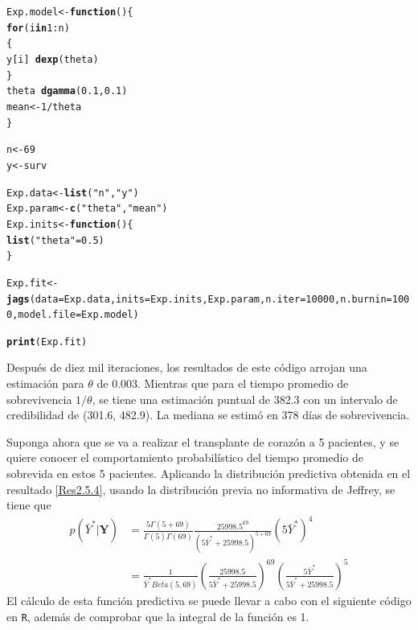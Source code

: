 \documentclass[10pt,openright]{book}\usepackage[]{graphicx}\usepackage[]{color}
\makeatletter
\newcommand{\hlnum}[1]{\textcolor[rgb]{0.686,0.059,0.569}{#1}}%
\newcommand{\hlstr}[1]{\textcolor[rgb]{0.192,0.494,0.8}{#1}}%
\newcommand{\hlopt}[1]{\textcolor[rgb]{0,0,0}{#1}}%
\newcommand{\hlstd}[1]{\textcolor[rgb]{0.345,0.345,0.345}{#1}}%
\newcommand{\hlkwa}[1]{\textcolor[rgb]{0.161,0.373,0.58}{\textbf{#1}}}%
\newcommand{\hlkwb}[1]{\textcolor[rgb]{0.69,0.353,0.396}{#1}}%
\newcommand{\hlkwc}[1]{\textcolor[rgb]{0.333,0.667,0.333}{#1}}%
\newcommand{\hlkwd}[1]{\textcolor[rgb]{0.737,0.353,0.396}{\textbf{#1}}}%
\newenvironment{kframe}{%
 \def\at@end@of@kframe{}%
 \ifinner\ifhmode%
  \def\at@end@of@kframe{\end{minipage}}%
  \begin{minipage}{\columnwidth}%
 \fi\fi%
 \def\FrameCommand##1{\hskip\@totalleftmargin \hskip-\fboxsep
 \colorbox{shadecolor}{##1}\hskip-\fboxsep
     \hskip-\linewidth \hskip-\@totalleftmargin \hskip\columnwidth}%
 \MakeFramed {\advance\hsize-\width
   \@totalleftmargin\z@ \linewidth\hsize
   \@setminipage}}%
 {\par\unskip\endMakeFramed%
 \at@end@of@kframe}
\newenvironment{knitrout}{}{} %
\makeatother
\begin{document}
\begin{Eje}
\begin{knitrout}
\color{fgcolor}\begin{kframe}
\begin{alltt}
\hlstd{Exp.model} \hlkwb{<-} \hlkwa{function}\hlstd{()\{}
\hlkwa{for}\hlstd{(i} \hlkwa{in} \hlnum{1}\hlopt{:}\hlstd{n)}
\hlstd{\{}
\hlstd{y[i]} \hlopt{~} \hlkwd{dexp}\hlstd{(theta)}
\hlstd{\}}
\hlstd{theta} \hlopt{~} \hlkwd{dgamma}\hlstd{(}\hlnum{0.1}\hlstd{,}\hlnum{0.1}\hlstd{)}
\hlstd{mean} \hlkwb{<-} \hlnum{1}\hlopt{/}\hlstd{theta}
\hlstd{\}}

\hlstd{n} \hlkwb{<-}\hlnum{69}
\hlstd{y} \hlkwb{<-} \hlstd{surv}

\hlstd{Exp.data} \hlkwb{<-} \hlkwd{list}\hlstd{(}\hlstr{"n"}\hlstd{,} \hlstr{"y"}\hlstd{)}
\hlstd{Exp.param} \hlkwb{<-} \hlkwd{c}\hlstd{(}\hlstr{"theta"}\hlstd{,} \hlstr{"mean"}\hlstd{)}
\hlstd{Exp.inits} \hlkwb{<-} \hlkwa{function}\hlstd{()\{}
\hlkwd{list}\hlstd{(}\hlstr{"theta"}\hlstd{=}\hlnum{0.5}\hlstd{)}
\hlstd{\}}

\hlstd{Exp.fit} \hlkwb{<-} \hlkwd{jags}\hlstd{(}\hlkwc{data}\hlstd{=Exp.data,} \hlkwc{inits}\hlstd{=Exp.inits, Exp.param,} \hlkwc{n.iter}\hlstd{=}\hlnum{10000}\hlstd{,} \hlkwc{n.burnin}\hlstd{=}\hlnum{1000}\hlstd{,} \hlkwc{model.file}\hlstd{=Exp.model)}

\hlkwd{print}\hlstd{(Exp.fit)}
\end{alltt}
\end{kframe}
\end{knitrout}
    
    Despu\'es de diez mil iteraciones, los resultados de este c\'odigo arrojan una estimaci\'on para $\theta$ de 0.003. Mientras que para el tiempo promedio de sobrevivencia $1/\theta$, se tiene una estimaci\'on puntual de 382.3 con un intervalo de credibilidad de (301.6, 482.9). La mediana se estim\'o en 378 d\'ias de sobrevivencia.
    
    Suponga ahora que se va a realizar el transplante de coraz\'on a 5 pacientes, y se quiere conocer el comportamiento probabil\'istico del tiempo promedio de sobrevida en estos 5 pacientes. Aplicando la distribuci\'on predictiva obtenida en el resultado \ref{Res2.5.4}, usando la distribuci\'on previa no informativa de Jeffrey, se tiene que
    \begin{align*}
    p(\bar{Y}^*|\mathbf{Y})&=\frac{5\Gamma(5+69)}{\Gamma(5)\Gamma(69)}\frac{25998.5^{69}}{(5\bar{Y}^*+25998.5)^{5+69}}(5\bar{Y}^*)^4\\
    &=\frac{1}{\bar{Y}^*Beta(5,69)}\left(\frac{25998.5}{5\bar{Y}^*+25998.5}\right)^{69}\left(\frac{5\bar{Y}^*}{5\bar{Y}^*+25998.5}\right)^5
    \end{align*}
    El c\'alculo de esta funci\'on predictiva se puede llevar a cabo con el siguiente c\'odigo en \verb"R", adem\'as de comprobar que la integral de la funci\'on es 1.
    

\end{Eje}
\end{document}

